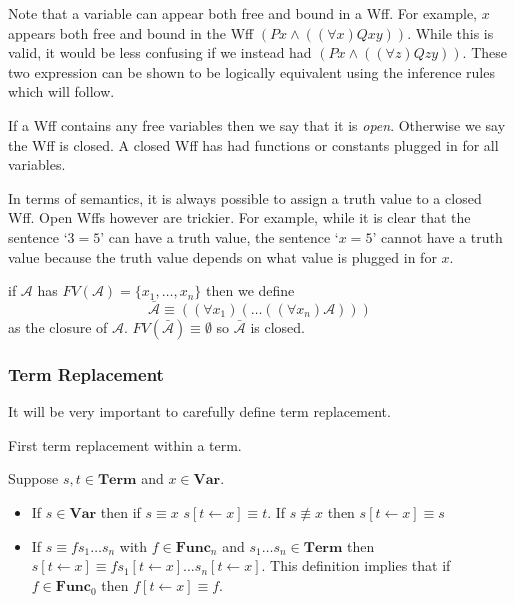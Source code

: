 \documentclass[12pt]{article}
\newcommand{\mc}[1]{\mathcal{#1}}
\begin{document}
Note that a variable can appear both free and bound in a Wff.
For example, $x$ appears both free and bound in the Wff $(Px \land ((\forall x)Qxy))$.
While this is valid, it would be less confusing if we instead had $(Px \land ((\forall z)Qzy))$.
These two expression can be shown to be logically equivalent using the inference rules which will follow.

If a Wff contains any free variables then we say that it is \textit{open}.
Otherwise we say the Wff is closed.
A closed Wff has had functions or constants plugged in for all variables.

In terms of semantics, it is always possible to assign a truth value to a closed Wff.
Open Wffs however are trickier.
For example, while it is clear that the sentence `$3=5$' can have a truth value, the sentence `$x=5$' cannot have a truth value because the truth value depends on what value is plugged in for $x$.

if $\mc{A}$ has $FV(\mc{A}) = \{x_1, \ldots, x_n\}$ then we define 
$$
\bar{\mc{A}} \equiv ((\forall x_1)(\ldots((\forall x_n)\mc{A})))
$$
as the closure of $\mc{A}$.
$FV(\bar{\mc{A}}) \equiv \emptyset$ so $\bar{\mc{A}}$ is closed.

\hrulefill

\subsubsection*{Term Replacement}

It will be very important to carefully define term replacement. 

First term replacement within a term.


Suppose $s, t\in \textbf{Term}$ and $x\in \textbf{Var}$.
\begin{itemize}
\item{If $s \in \textbf{Var}$ then if $s\equiv x$ $s[t\leftarrow x] \equiv t$. If $s \not\equiv x$ then $s[t\leftarrow x] \equiv s$}
\item{If $s \equiv fs_1\ldots s_n$ with $f\in \textbf{Func}_n$ and $s_1\ldots s_n \in \textbf{Term}$ then \\ $s[t\leftarrow x] \equiv fs_1[t\leftarrow x]\ldots s_n[t\leftarrow x]$. This definition implies that if $f\in \textbf{Func}_0$ then $f[t\leftarrow x] \equiv f$.}
\end{itemize}
\end{document}
